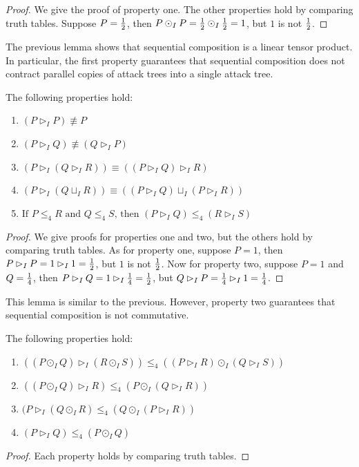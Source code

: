 \documentclass{llncs}
\begin{document}
\begin{proof}
  We give the proof of property one.  The other properties hold by
  comparing truth tables.  Suppose $P = \frac{1}{2}$, then $P \odot_I P =
  \frac{1}{2} \odot_I \frac{1}{2} = 1$, but $1$ is not $\frac{1}{2}$.
\end{proof}
The previous lemma shows that sequential composition is a linear
tensor product.  In particular, the first property guarantees that
sequential composition does not contract parallel copies of attack
trees into a single attack tree.
\begin{lemma}
  \label{lemma:basic_properties_for_parallel}
  The following properties hold:
  \begin{enumerate}
  \item $(P \rhd_I P) \not\equiv P$\\[-5px]
  \item $(P \rhd_I Q) \not\equiv (Q \rhd_I P)$\\[-5px]
  \item $(P \rhd_I (Q \rhd_I R)) \equiv ((P \rhd_I Q) \rhd_I R)$\\[-5px]
  \item $(P \rhd_I (Q \sqcup_I R)) \equiv ((P \rhd_I Q) \sqcup_I (P \rhd_I R))$\\[-5px]
  \item $\text{If }P \leq_4 R \text{ and } Q \leq_4 S \text{, then } (P \rhd_I Q) \leq_4 (R \rhd_I S)$
  \end{enumerate}
\end{lemma}
\begin{proof}
  We give proofs for properties one and two, but the others hold by
  comparing truth tables.  As for property one, suppose $P = 1$, then
  $P \rhd_I P = 1 \rhd_I 1 = \frac{1}{2}$, but $1$ is not $\frac{1}{2}$.  Now for
  property two, suppose $P = 1$ and $Q = \frac{1}{4}$, then $P \rhd_I Q = 1
  \rhd_I \frac{1}{4} = \frac{1}{2}$, but $Q \rhd_I P = \frac{1}{4} \rhd_I 1 = \frac{1}{4}$.
\end{proof}
This lemma is similar to the previous.  However, property two
guarantees that sequential composition is not commutative.
\begin{lemma}
  \label{lemma:the_ideal_properties}
  The following properties hold:
  \begin{enumerate}
  \item $((P \odot_I Q) \rhd_I (R \odot_I S)) \leq_4 ((P \rhd_I R) \odot_I (Q \rhd_I S))$\\[-5px]
  \item $((P \odot_I Q) \rhd_I R) \leq_4 (P \odot_I (Q \rhd_I R))$\\[-5px]
  \item $(P \rhd_I (Q \odot_I R) \leq_4 (Q \odot_I (P \rhd_I R))$\\[-5px]
  \item $(P \rhd_I Q) \leq_4 (P \odot_I Q)$
  \end{enumerate}
\end{lemma}
\begin{proof}
  Each property holds by comparing truth tables.
\end{proof}
\end{document}
